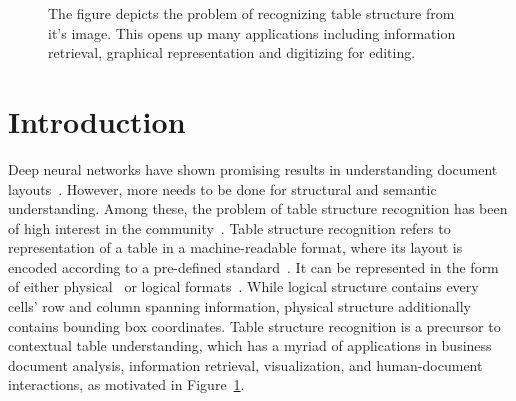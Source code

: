 \documentclass[runningheads]{llncs}
\begin{document}
\begin{figure}[ht!]
\begin{center}
\end{center}
\caption{The figure depicts the problem of recognizing table structure from it's image. This opens up many applications including information retrieval, graphical representation and digitizing for editing.} \label{fig_introduction}
\end{figure}

\section{Introduction} \label{introduction}

Deep neural networks have shown promising results in understanding document layouts~\cite{yang2017learning,augusto2017fast,icdar_2017}. However, more needs to be done for structural and semantic understanding. Among these, the problem of table structure recognition has been of high interest in the community~\cite{hu1999medium,wang2004table,nishida2017understanding,schreiber2017deepdesrt,bao2018table,qasim2019rethinking,table_splitting,li2019tablebank,paliwal2019tablenet,zhong2019image,chi2019complicated,Khan_2019,Siddiqui2019Rethinking,xue2019res2tim,gobel2013icdar,gao2019icdar,ajoy2020_das}. Table structure recognition refers to representation of a table in a machine-readable format, where its layout is encoded according to a pre-defined standard~\cite{table_splitting,li2019tablebank,paliwal2019tablenet,zhong2019image,chi2019complicated,xue2019res2tim}. It can be represented in the form of either physical~\cite{table_splitting,paliwal2019tablenet,chi2019complicated,xue2019res2tim} or logical formats~\cite{li2019tablebank,zhong2019image}. While logical structure contains every cells' row and column spanning information, physical structure additionally contains bounding box coordinates. Table structure recognition is a precursor to contextual table understanding, which has a myriad of applications in business document analysis, information retrieval, visualization, and human-document interactions, as motivated in Figure~\ref{fig_introduction}. 
\end{document}
